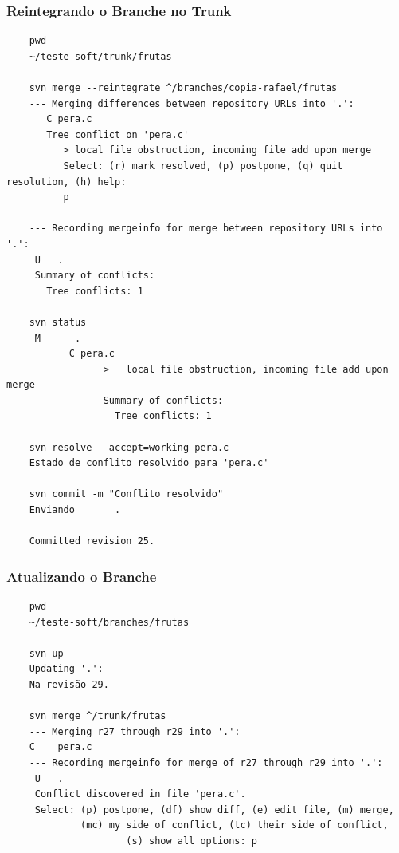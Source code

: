 \documentclass{beamer}
\begin{document}
\begin{frame}[fragile]
    \frametitle{Reintegrando o Branche no Trunk}

    \begin{bash}{}
    {\tiny
    \begin{verbatim}
    pwd
    ~/teste-soft/trunk/frutas

    svn merge --reintegrate ^/branches/copia-rafael/frutas
    --- Merging differences between repository URLs into '.':
       C pera.c
       Tree conflict on 'pera.c'
          > local file obstruction, incoming file add upon merge
          Select: (r) mark resolved, (p) postpone, (q) quit resolution, (h) help: 
          p

    --- Recording mergeinfo for merge between repository URLs into '.':
     U   .
     Summary of conflicts:
       Tree conflicts: 1

    svn status
     M      .
           C pera.c
                 >   local file obstruction, incoming file add upon merge
                 Summary of conflicts:
                   Tree conflicts: 1

    svn resolve --accept=working pera.c
    Estado de conflito resolvido para 'pera.c'

    svn commit -m "Conflito resolvido"
    Enviando       .

    Committed revision 25.
    \end{verbatim}
    }
    \end{bash}

\end{frame}

\begin{frame}[fragile]
    \frametitle{Atualizando o Branche}

    \begin{bash}{}
    {\tiny
    \begin{verbatim}
    pwd
    ~/teste-soft/branches/frutas

    svn up
    Updating '.':
    Na revisão 29.

    svn merge ^/trunk/frutas
    --- Merging r27 through r29 into '.':
    C    pera.c
    --- Recording mergeinfo for merge of r27 through r29 into '.':
     U   .
     Conflict discovered in file 'pera.c'.
     Select: (p) postpone, (df) show diff, (e) edit file, (m) merge,
             (mc) my side of conflict, (tc) their side of conflict,
                     (s) show all options: p

    \end{verbatim}
    }
    \end{bash}

\end{frame}
\end{document}
